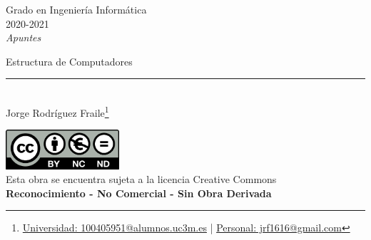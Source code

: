 \documentclass[12pt, twoside, openright]{report} %
\begin{document}
	
\begin{titlepage}
	\begin{sffamily}
	\color{azulUC3M}
	\begin{center}
		\begin{figure}[H] %
		\end{figure}
		\vspace{2.5cm}
		\begin{Large}
			Grado en Ingeniería Informática\\			
			2020-2021\\
			\vspace{2cm}		
			\textsl{Apuntes}\\
			\bigskip
		\end{Large}
		 	{\Huge Estructura de Computadores}\\
		 	\vspace*{0.5cm}
	 		\rule{10.5cm}{0.1mm}\\
			\vspace*{0.9cm}
			{\LARGE Jorge Rodríguez Fraile\footnote{\href{mailto:100405951@alumnos.uc3m.es}{Universidad: 100405951@alumnos.uc3m.es}  |  \href{mailto:jrf1616@gmail.com}{Personal: jrf1616@gmail.com}}}\\ 
			\vspace*{1cm}
	\end{center}
	\vfill
	\color{black}
		\includegraphics[width=4.2cm]{img/creativecommons.png}\\
		Esta obra se encuentra sujeta a la licencia Creative Commons\\ \textbf{Reconocimiento - No Comercial - Sin Obra Derivada}
	\end{sffamily}
\end{titlepage}


\tableofcontents
\thispagestyle{fancy}
\end{document}
